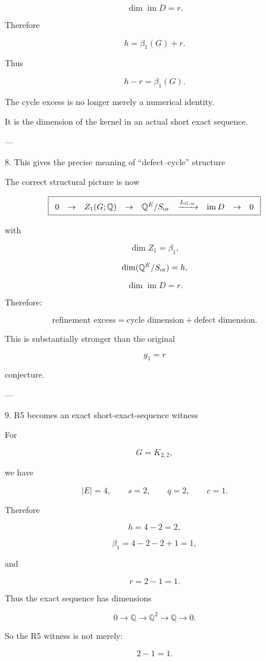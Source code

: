 \[
\dim\operatorname{im}D=r.
\]

Therefore

\[
\boxed{
h=\beta_1(G)+r.
}
\]

Thus

\[
\boxed{
h-r=\beta_1(G).
}
\]

The cycle excess is no longer merely a numerical identity.

It is the dimension of the kernel in an actual short exact sequence.


---

8. This gives the precise meaning of “defect–cycle” structure

The correct structural picture is now

\[
\boxed{
\begin{array}{ccccccccc}
0&\to&
Z_1(G;\mathbb Q)
&\to&
\mathbb Q^E/S_{\rm or}
&\xrightarrow{L_{G,w}}&
\operatorname{im}D
&\to&0
\end{array}
}
\]

with

\[
\dim Z_1=\beta_1,
\]

\[
\dim(\mathbb Q^E/S_{\rm or})=h,
\]

\[
\dim\operatorname{im}D=r.
\]

Therefore:

\[
\boxed{
\text{refinement excess}
=
\text{cycle dimension}
+
\text{defect dimension}.
}
\]

This is substantially stronger than the original

\[
g_1=r
\]

conjecture.


---

9. R5 becomes an exact short-exact-sequence witness

For

\[
G=K_{2,2},
\]

we have

\[
|E|=4,\qquad s=2,\qquad q=2,\qquad c=1.
\]

Therefore

\[
h=4-2=2,
\]

\[
\beta_1=4-2-2+1=1,
\]

and

\[
r=2-1=1.
\]

Thus the exact sequence has dimensions

\[
0\to\mathbb Q
\to\mathbb Q^2
\to\mathbb Q
\to0.
\]

So the R5 witness is not merely:

\[
2-1=1.
\]


